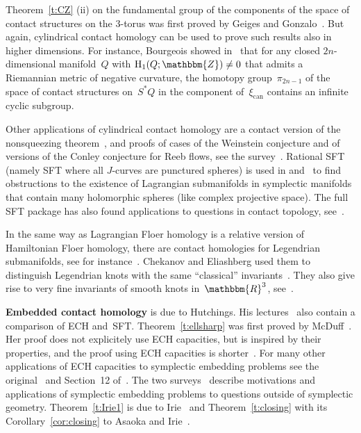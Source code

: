 \documentclass[12pt,twoside]{amsart}
\theoremstyle{plain}
\numberwithin{figure}{section}
\numberwithin{equation}{section}
\def\s{\smallskip}
\def\can{\operatorname{can}}
\def\H{\operatorname{H}}
\def\RR{\mathbbm{R}}
\def\ZZ{\mathbbm{Z}}
\def\ni{\noindent}
\begin{document}
Theorem~\ref{t:CZ} (ii) on the fundamental group of the components of the space of contact structures 
on the 3-torus was first proved by Geiges and Gonzalo~\cite{gego04}.
But again, cylindrical contact homology can be used to prove such results also in higher dimensions. 
%
For instance, Bourgeois showed in~\cite{bou06} that 
for any closed $2n$-dimensional manifold~$Q$ with $\H_1(Q;\ZZ) \neq 0$ that admits a Riemannian metric of negative curvature,
the homotopy group~$\pi_{2n-1}$ of the space of contact structures 
on~$S^*Q$ in the component of~$\xi_{\can}$ contains an infinite cyclic subgroup.

Other applications of cylindrical contact homology are 
a contact version of the nonsqueezing theorem~\cite{elkipo06, fra16}, 
and proofs of cases of the Weinstein conjecture and of versions of the Conley conjecture 
for Reeb flows, see the survey~\cite{GiGu15}. 
Rational SFT (namely SFT where all $J$-curves are punctured spheres) 
is used in \cite{ElGiHo00} and~\cite{cimo14}
to find obstructions to the existence of Lagrangian submanifolds in 
symplectic manifolds that contain many holomorphic spheres (like complex projective space).
The full SFT package has also found applications to questions in contact topology, see~\cite{lawe11}.

In the same way as Lagrangian Floer homology is a relative version of Hamiltonian Floer homology, 
there are contact homologies for Legendrian submanifolds, 
see for instance~\cite{eketsu07}.
Chekanov and Eliashberg used them to distinguish Legendrian knots with the same 
``classical'' invariants~\cite{ch02}. 
They also give rise to very fine invariants of smooth knots in~$\RR^3$, see~\cite{CELN16, ekngsh16, ng05}.

\s \ni
{\bf Embedded contact homology} is due to Hutchings.
His lectures~\cite{Hu14} also contain a 
comparison of ECH and~SFT.
%
Theorem~\ref{t:ellsharp} was first proved by McDuff~\cite{Mc11}.
Her proof does not explicitely use ECH capacities, but is inspired
by their properties, and the proof using ECH capacities is shorter~\cite{Hu11b}. 
For many other applications of ECH capacities to symplectic embedding problems
see the original~\cite{Hu11} and Section~12 of~\cite{Sch17}.
The two surveys~\cite{CHLS, Sch17} describe motivations and applications of symplectic embedding 
problems to questions outside of symplectic geometry.
%
Theorem~\ref{t:Irie1} is due to Irie~\cite{Ir15} and Theorem~\ref{t:closing} with its Corollary~\ref{cor:closing}
to Asaoka and Irie~\cite{AsIr16}.
\end{document}

